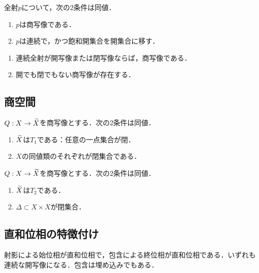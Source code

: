 \documentclass[uplatex,dvipdfmx]{jsreport}
\begin{document}
\begin{proposition}[全射が商写像になるための条件]
    全射$p$について，次の2条件は同値．
    \begin{enumerate}
        \item $p$は商写像である．
        \item $p$は連続で，かつ飽和開集合を開集合に移す．
    \end{enumerate}
\end{proposition}

\begin{corollary}\mbox{}\label{cor-open-continuous-surjection-is-quotient-map}
    \begin{enumerate}
        \item 連続全射が開写像または閉写像ならば，商写像である．
        \item 開でも閉でもない商写像が存在する．
    \end{enumerate}
\end{corollary}

\subsection{商空間}

\begin{proposition}
    $Q:X\to\widetilde{X}$を商写像とする．次の2条件は同値．
    \begin{enumerate}
        \item $\widetilde{X}$は$T_1$である：任意の一点集合が閉．
        \item $X$の同値類のそれぞれが閉集合である．
    \end{enumerate}
\end{proposition}

\begin{proposition}
    $Q:X\to\widetilde{X}$を商写像とする．次の2条件は同値．
    \begin{enumerate}
        \item $\widetilde{X}$は$T_2$である．
        \item $\Delta\subset X\times X$が閉集合．
    \end{enumerate}
\end{proposition}


\subsection{直和位相の特徴付け}

\begin{tcolorbox}[colframe=ForestGreen, colback=ForestGreen!10!white,breakable,colbacktitle=ForestGreen!40!white,coltitle=black,fonttitle=\bfseries\sffamily,
title=]
    射影による始位相が直和位相で，包含による終位相が直和位相である．いずれも連続な開写像になる．包含は埋め込みでもある．
\end{tcolorbox}
\end{document}
